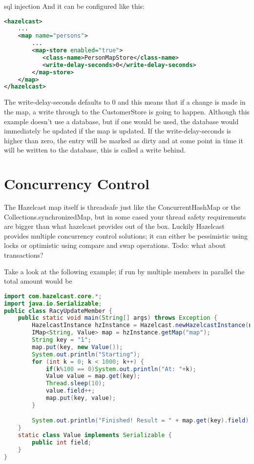 sql injection
And it can be configured like this:

\begin{lstlisting}[language=xml]
<hazelcast>
    ...
    <map name="persons">
        ...
        <map-store enabled="true">
           <class-name>PersonMapStore</class-name>
           <write-delay-seconds>0</write-delay-seconds>
        </map-store>
    </map>
</hazelcast>
\end{lstlisting}

The write-delay-seconds defaults to 0 and this means that if a change is made in the map, a write through to the CustomerStore is going to happen. Although this example doesn't use a database, but if one would be used, the database would immediately be updated if the map is updated. If the write-delay-seconds is higher than zero, the entry will be marked as dirty and at some point in time it will be written to the database, this is called a write behind.

\section{Concurrency Control}
The Hazelcast map itself is threadsafe just like the ConcurrentHashMap or the Collections.synchronizedMap, but in some cased your thread safety requirements are bigger than what hazelcast provides out of the box. Luckily Hazelcast provides multiple concurrency control solutions;  it can either be pessimistic using locks or optimistic using compare and swap operations. Todo: what about transactions?

Take a look at the following example; if run by multiple members in parallel the total amount would be 
\begin{lstlisting}[language=java]
import com.hazelcast.core.*;
import java.io.Serializable;
public class RacyUpdateMember {
    public static void main(String[] args) throws Exception {
        HazelcastInstance hzInstance = Hazelcast.newHazelcastInstance(null);
        IMap<String, Value> map = hzInstance.getMap("map");
        String key = "1";
        map.put(key, new Value());
        System.out.println("Starting");
        for (int k = 0; k < 1000; k++) {
            if(k%100 == 0)System.out.println("At: "+k);
            Value value = map.get(key);
            Thread.sleep(10);
            value.field++;
            map.put(key, value);
        }

        System.out.println("Finished! Result = " + map.get(key).field);
    }
    static class Value implements Serializable {
        public int field;
    }
}
\end{lstlisting}

